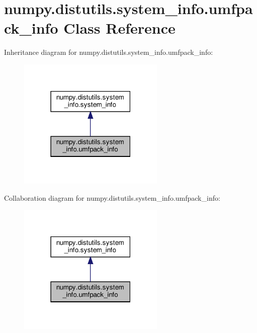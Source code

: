 \hypertarget{classnumpy_1_1distutils_1_1system__info_1_1umfpack__info}{}\section{numpy.\+distutils.\+system\+\_\+info.\+umfpack\+\_\+info Class Reference}
\label{classnumpy_1_1distutils_1_1system__info_1_1umfpack__info}


Inheritance diagram for numpy.\+distutils.\+system\+\_\+info.\+umfpack\+\_\+info\+:
\nopagebreak
\begin{figure}[H]
\begin{center}
\leavevmode
\includegraphics[width=198pt]{classnumpy_1_1distutils_1_1system__info_1_1umfpack__info__inherit__graph}
\end{center}
\end{figure}


Collaboration diagram for numpy.\+distutils.\+system\+\_\+info.\+umfpack\+\_\+info\+:
\nopagebreak
\begin{figure}[H]
\begin{center}
\leavevmode
\includegraphics[width=198pt]{classnumpy_1_1distutils_1_1system__info_1_1umfpack__info__coll__graph}
\end{center}
\end{figure}
